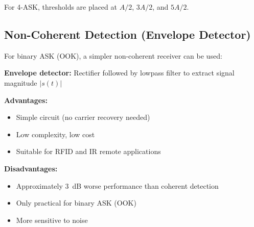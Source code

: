 For 4-ASK, thresholds are placed at $A/2$, $3A/2$, and $5A/2$.

\subsection{Non-Coherent Detection (Envelope Detector)}

For binary ASK (OOK), a simpler non-coherent receiver can be used:

\begin{center}
\end{center}

\textbf{Envelope detector:} Rectifier followed by lowpass filter to extract signal magnitude $|s(t)|$

\textbf{Advantages:}
\begin{itemize}
\item[\checkmark] Simple circuit (no carrier recovery needed)
\item[\checkmark] Low complexity, low cost
\item[\checkmark] Suitable for RFID and IR remote applications
\end{itemize}

\textbf{Disadvantages:}
\begin{itemize}
\item[\texttimes] Approximately 3~dB worse performance than coherent detection
\item[\texttimes] Only practical for binary ASK (OOK)
\item[\texttimes] More sensitive to noise
\end{itemize}

